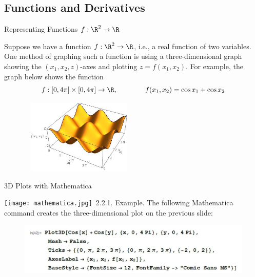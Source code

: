 \documentclass[smaller,hyperref={CJKbookmarks=true}]{beamer}
\begin{document}
\subsection{Functions and Derivatives}
\begin{frame}[c]
\begin{spacing}{2.5}
\tableofcontents[sectionstyle=hide,subsectionstyle=show/shaded/hide]
\end{spacing}
\end{frame}
\begin{frame}[t]{Representing Functions $f:\R^2\to\R$}
\begin{spacing}{1.1}
Suppose we have a function $f:\R^2\to\R$, i.e., a real function of two variables. One method of graphing such a function is using a three-dimensional graph showing the $(x_1,x_2,z)$-axes and plotting $z=f(x_1,x_2)$. For example, the graph below shows the function
\begin{equation*}
  f:[0,4\pi]\times[0,4\pi]\to\R,\qquad\qquad f(x_1,x_2)=\cos x_1+\cos x_2
\end{equation*}
\begin{figure}
  \centering
  \includegraphics[width=0.5\textwidth,height=100pt]{mt1.jpg}

\end{figure}
\end{spacing}
\end{frame}
\begin{frame}[t]{3D Plots with Mathematica}
\begin{spacing}{1.2}
\texttt{[image: mathematica.jpg]}~\alert{2.2.1. Example.} The following Mathematica command creates the three-dimensional plot on the previous slide:
\begin{figure}
  \centering
  \includegraphics[width=\textwidth]{42.jpg}

\end{figure}
\end{spacing}
\end{frame}
\end{document}
